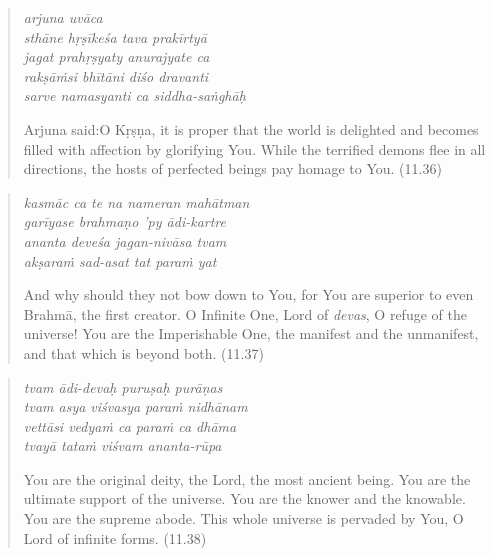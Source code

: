 \documentclass[12pt, twoside, openright]{memoir}
\begin{document}
\par
\begin{verse}
\textit{arjuna uvāca} \\
\textit{sthāne hṛṣīkeśa tava prakīrtyā} \\
\textit{jagat prahṛṣyaty anurajyate ca} \\
\textit{rakṣāṁsi bhītāni diśo dravanti} \\
\textit{sarve namasyanti ca siddha-saṅghāḥ}

\noindent \quad Arjuna said:\linebreak O Kṛṣṇa, it is proper that the world is delighted and becomes filled with affection by glorifying You. While the terrified demons flee in all directions, the hosts of perfected beings pay homage to You. (11.36)
\end{verse}
\par



\par
\begin{verse}
\textit{kasmāc ca te na nameran mahātman} \\
\textit{garīyase brahmaṇo ’py ādi-kartre} \\
\textit{ananta deveśa jagan-nivāsa tvam} \\
\textit{akṣaraṁ sad-asat tat paraṁ yat}

\noindent And why should they not bow down to You, for You are superior to even Brahmā, the first creator. O Infinite One, Lord of \textit{devas}, O refuge of the universe! You are the Imperishable One, the manifest and the unmanifest, and that which is beyond both. (11.37)
\end{verse}
\par



\par
\begin{verse}
\textit{tvam ādi-devaḥ puruṣaḥ purāṇas} \\
\textit{tvam asya viśvasya paraṁ nidhānam} \\
\textit{vettāsi vedyaṁ ca paraṁ ca dhāma} \\
\textit{tvayā tataṁ viśvam ananta-rūpa}

\noindent You are the original deity, the Lord, the most ancient being. You are the ultimate support of the universe. You are the knower and the knowable. You are the supreme abode. This whole universe is pervaded by You, O Lord of infinite forms. (11.38)
\end{verse}
\par
\end{document}
